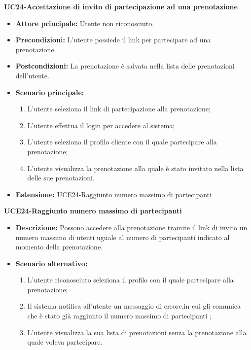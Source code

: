 \textbf{UC24-Accettazione di invito di partecipazione ad una prenotazione}
\begin{itemize}
    \item \textbf{Attore principale: } Utente non riconosciuto.
    \item \textbf{Precondizioni: }L'utente possiede il link per partecipare ad una prenotazione.
    \item \textbf{Postcondizioni: }La prenotazione è salvata nella lista delle prenotazioni dell'utente.
    \item \textbf{Scenario principale:} 
        \begin{enumerate}
            \item L'utente seleziona il link di partecipazione alla prenotazione;
            \item L'utente effettua il login per accedere al sistema;
            \item L'utente seleziona il profilo cliente con il quale partecipare alla prenotazione;
            \item L'utente visualizza la prenotazione alla quale è stato invitato nella lista delle sue
            prenotazioni.
        \end{enumerate}
        \item \textbf{Estensione: }UCE24-Raggiunto numero massimo di partecipanti
    \end{itemize}

\textbf{UCE24-Raggiunto numero massimo di partecipanti}
\begin{itemize}
    \item \textbf{Descrizione: }Possono accedere alla prenotazione tramite il link di
    invito un numero massimo di utenti uguale al numero di partecipanti indicato al momento della
    prenotazione.
    \item \textbf{Scenario alternativo: }
    \begin{enumerate}
        \item L'utente riconosciuto seleziona il profilo con il quale partecipare alla prenotazione;
        \item Il sistema notifica all'utente un messaggio di errore,in cui gli comunica che è stato
        già raggiunto il numero massimo di partecipanti ;
        \item L'utente visualizza la sua lista di prenotazioni senza la prenotazione alla quale voleva
        partecipare.
    \end{enumerate}
\end{itemize}

